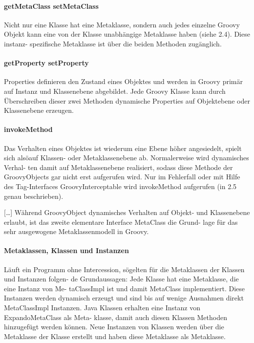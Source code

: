 \documentclass[11pt,english,ngerman, headsepline]{scrreprt}
\begin{document}
\paragraph{ getMetaClass setMetaClass} Nicht nur eine Klasse hat eine
Metaklasse, sondern auch jedes einzelne Groovy Objekt kann eine von der Klasse
unabhängige Metaklasse haben (siehe 2.4). Diese instanz- spezifische Metaklasse
ist über die beiden Methoden zugänglich.\\

\paragraph{ getProperty setProperty} Properties definieren den Zustand eines
Objektes und werden in Groovy primär auf Instanz und Klassenebene abgebildet. Jede Groovy
Klasse kann durch Überschreiben dieser zwei Methoden dynamische Properties auf
Objektebene oder Klassenebene erzeugen. \\

\paragraph{ invokeMethod } Das Verhalten eines Objektes ist wiederum eine Ebene
höher angesiedelt, spielt sich alsöauf Klassen- oder Metaklassenebene ab.
Normalerweise wird dynamisches Verhal- ten damit auf Metaklassenebene
realisiert, sodass diese Methode der GroovyObjects gar nicht erst aufgerufen
wird. Nur im Fehlerfall oder mit Hilfe des Tag-Interfaces GroovyInterceptable
wird invokeMethod aufgerufen (in 2.5 genau beschrieben).

[\ldots] Während GroovyObject dynamisches Verhalten auf Objekt- und
Klassenebene erlaubt, ist das zweite elementare Interface MetaClass die Grund-
lage für das sehr ausgewogene Metaklassenmodell in Groovy.

\paragraph{ Metaklassen, Klassen und Instanzen} Läuft ein Programm ohne
Intercession, sögelten für die Metaklassen der Klassen und Instanzen folgen- de
Grundaussagen: Jede Klasse hat eine Metaklasse, die eine Instanz von Me-
taClassImpl ist und damit MetaClass implementiert. Diese Instanzen werden
dynamisch erzeugt und sind bis auf wenige Ausnahmen direkt MetaClassImpl
Instanzen. Java Klassen erhalten eine Instanz von ExpandoMetaClass als Meta-
klasse, damit auch diesen Klassen Methoden hinzugefügt werden können. Neue
Instanzen von Klassen werden über die Metaklasse der Klasse erstellt und haben
diese Metaklasse als Metaklasse.
\end{document}
